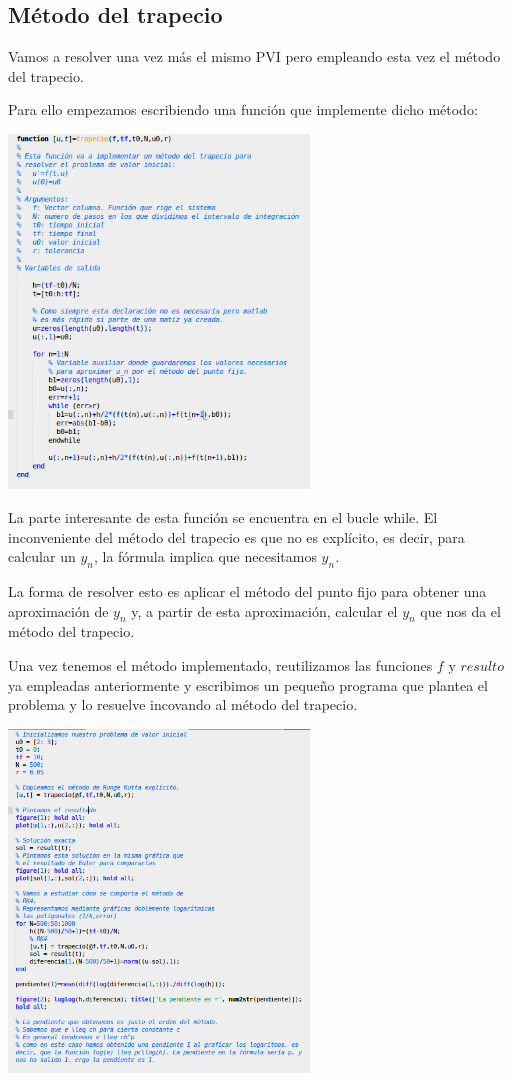 \subsection{Método del trapecio}
Vamos a resolver una vez más el mismo PVI pero empleando esta vez el método del trapecio.

Para ello empezamos escribiendo una función que implemente dicho método:
\begin{center}
\includegraphics[width=0.6\textwidth]{img/trapecio.png}
\end{center}

La parte interesante de esta función se encuentra en el bucle while. El inconveniente del método del trapecio es que no es explícito, es decir, para calcular un $y_{n}$, la fórmula implica que necesitamos $y_n$.

La forma de resolver esto es aplicar el método del punto fijo para obtener una aproximación de $y_n$ y, a partir de esta aproximación, calcular el $y_n$ que nos da el método del trapecio.

Una vez tenemos el método implementado, reutilizamos las funciones $f$ y $resulto$ ya empleadas anteriormente y escribimos un pequeño programa que plantea el problema y lo resuelve incovando al método del trapecio.

\begin{center}
\includegraphics[width=0.6\textwidth]{img/PVI_trapecio.png}
\end{center}

